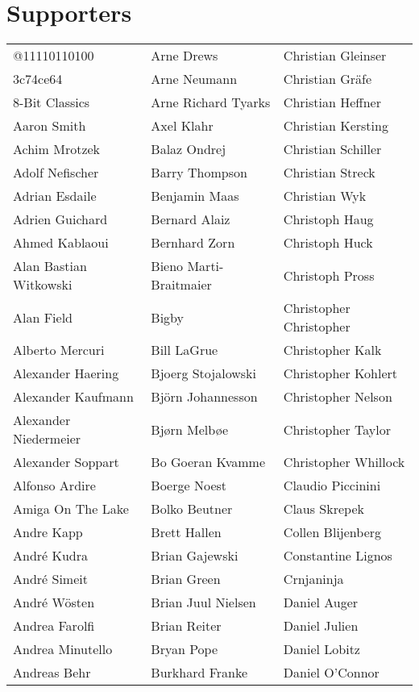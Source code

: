 \newpage
\section{Supporters}

\setlength{\tabcolsep}{1mm}
\begin{tabular}{p{4.5cm}p{4.5cm}p{4.5cm}}
@11110110100 & Arne Drews & Christian Gleinser \\
3c74ce64 & Arne Neumann & Christian Gräfe \\
8-Bit Classics & Arne Richard Tyarks & Christian Heffner \\
Aaron Smith & Axel Klahr & Christian Kersting \\
Achim Mrotzek & Balaz Ondrej & Christian Schiller \\
Adolf Nefischer & Barry Thompson & Christian Streck \\
Adrian Esdaile & Benjamin Maas & Christian Wyk \\
Adrien Guichard & Bernard Alaiz & Christoph Haug \\
Ahmed Kablaoui & Bernhard Zorn & Christoph Huck \\
Alan Bastian Witkowski & Bieno Marti-Braitmaier & Christoph Pross \\
Alan Field & Bigby & Christopher Christopher \\
Alberto Mercuri & Bill LaGrue & Christopher Kalk \\
Alexander Haering & Bjoerg Stojalowski & Christopher Kohlert \\
Alexander Kaufmann & Björn Johannesson & Christopher Nelson \\
Alexander Niedermeier & Bjørn Melbøe & Christopher Taylor \\
Alexander Soppart & Bo Goeran Kvamme & Christopher Whillock \\
Alfonso Ardire & Boerge Noest & Claudio Piccinini \\
Amiga On The Lake & Bolko Beutner & Claus Skrepek \\
Andre Kapp & Brett Hallen & Collen Blijenberg \\
André Kudra & Brian Gajewski & Constantine Lignos \\
André Simeit & Brian Green & Crnjaninja \\
André Wösten & Brian Juul Nielsen & Daniel Auger \\
Andrea Farolfi & Brian Reiter & Daniel Julien \\
Andrea Minutello & Bryan Pope & Daniel Lobitz \\
Andreas Behr & Burkhard Franke & Daniel O'Connor \\

\end{tabular}
